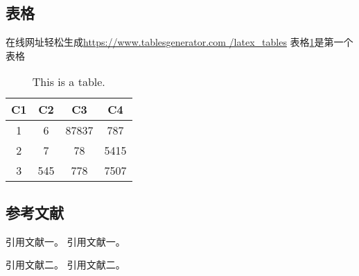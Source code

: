 \documentclass[UTF8]{article}%
\newcommand{\upcite}[1]{\textsuperscript{\cite{#1}}} %
\begin{document}
\subsection{表格}
在线网址轻松生成\url{https://www.tablesgenerator.com
/latex_tables}
表格\ref{table:1}是第一个表格
\begin{table}[h!]                                   %
    \centering                                      %
    \begin{tabular}{|c|c c c||}                     %
     \hline                                         %
     C1 & C2 & C3 & C4 \\ [0.5ex]                   %
     \hline\hline                                   %
     1 & 6 & 87837 & 787 \\                         %
     2 & 7 & 78 & 5415 \\
     3 & 545 & 778 & 7507 \\
     \hline
    \end{tabular}                                   %
    \caption{This is a table.}                      %
    \label{table:1}                                 %
    \end{table}

    
\subsection{参考文献}
引用文献一\cite{1}。 引用文献一\upcite{1}。%

引用文献二\cite{2}。 引用文献二\upcite{2}。

\end{document}
